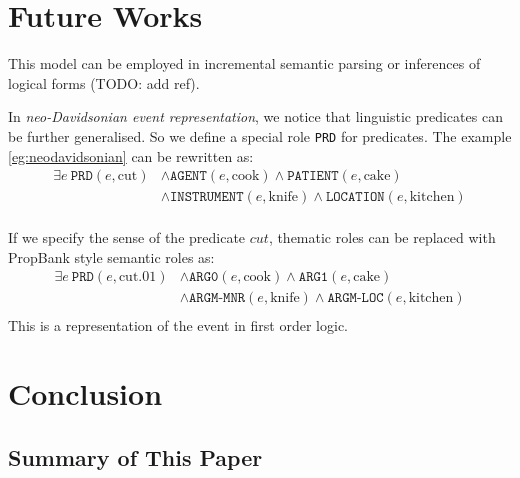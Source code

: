 \documentclass[a4paper]{article}
\begin{document}
\section{Future Works}
This model can be employed in incremental semantic parsing \citep{konstas2014incremental, konstas2015semantic} or inferences of logical forms (TODO: add ref). 

In \textit{neo-Davidsonian event representation}, we notice that linguistic predicates can be further generalised. So we define a special role \texttt{PRD} for predicates. The example \ref{eg:neodavidsonian} can be rewritten as: 
\begin{equation*} \label{eg:symbolic-thematic}
\begin{aligned}
    \exists e\ \texttt{PRD}(e, \text{cut})
    & \land \texttt{AGENT}(e, \text{cook}) \land \texttt{PATIENT}(e, \text{cake}) \\
    & \land \texttt{INSTRUMENT}(e, \text{knife}) \land \texttt{LOCATION}(e, \text{kitchen}) \\
\end{aligned}
\end{equation*}

If we specify the sense of the predicate $cut$, thematic roles can be replaced with PropBank style semantic roles as: 
\begin{equation*} \label{eg:symbolic-semantic}
\begin{aligned}
    \exists e\ \texttt{PRD}(e, \text{cut.01})
    & \land \texttt{ARG0}(e, \text{cook}) \land \texttt{ARG1}(e, \text{cake}) \\
    & \land \texttt{ARGM-MNR}(e, \text{knife}) \land \texttt{ARGM-LOC}(e, \text{kitchen}) \\
\end{aligned}
\end{equation*}
This is a representation of the event in first order logic. 


\section{Conclusion} 
\subsection{Summary of This Paper} 






 

\newpage


\end{document}
